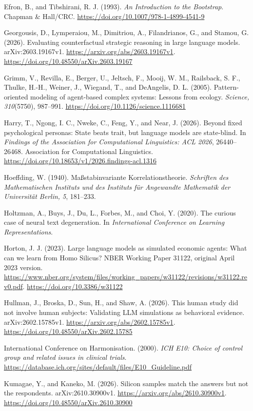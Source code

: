 \documentclass[11pt]{article}
\begin{document}
Efron, B., and Tibshirani, R. J. (1993). \emph{An Introduction to the
Bootstrap}. Chapman \& Hall/CRC.
\url{https://doi.org/10.1007/978-1-4899-4541-9}

Georgousis, D., Lymperaiou, M., Dimitriou, A., Filandrianos, G., and
Stamou, G. (2026). Evaluating counterfactual strategic reasoning in
large language models. arXiv:2603.19167v1.
\url{https://arxiv.org/abs/2603.19167v1}.
\url{https://doi.org/10.48550/arXiv.2603.19167}

Grimm, V., Revilla, E., Berger, U., Jeltsch, F., Mooij, W. M.,
Railsback, S. F., Thulke, H.-H., Weiner, J., Wiegand, T., and DeAngelis,
D. L. (2005). Pattern-oriented modeling of agent-based complex systems:
Lessons from ecology. \emph{Science, 310}(5750), 987--991.
\url{https://doi.org/10.1126/science.1116681}

Harry, T., Ngong, I. C., Nweke, C., Feng, Y., and Near, J. (2026).
Beyond fixed psychological personas: State beats trait, but language
models are state-blind. In \emph{Findings of the Association for
Computational Linguistics: ACL 2026}, 26440--26468. Association for
Computational Linguistics.
\url{https://doi.org/10.18653/v1/2026.findings-acl.1316}

Hoeffding, W. (1940). Maßstabinvariante Korrelationstheorie.
\emph{Schriften des Mathematischen Instituts und des Instituts für
Angewandte Mathematik der Universität Berlin, 5}, 181--233.

Holtzman, A., Buys, J., Du, L., Forbes, M., and Choi, Y. (2020). The
curious case of neural text degeneration. In \emph{International
Conference on Learning Representations}.

Horton, J. J. (2023). Large language models as simulated economic
agents: What can we learn from Homo Silicus? NBER Working Paper 31122,
original April 2023 version.
\url{https://www.nber.org/system/files/working_papers/w31122/revisions/w31122.rev0.pdf}.
\url{https://doi.org/10.3386/w31122}

Hullman, J., Broska, D., Sun, H., and Shaw, A. (2026). This human study
did not involve human subjects: Validating LLM simulations as behavioral
evidence. arXiv:2602.15785v1. \url{https://arxiv.org/abs/2602.15785v1}.
\url{https://doi.org/10.48550/arXiv.2602.15785}

International Conference on Harmonisation. (2000). \emph{ICH E10: Choice
of control group and related issues in clinical trials}.
\url{https://database.ich.org/sites/default/files/E10_Guideline.pdf}

Kumagae, Y., and Kaneko, M. (2026). Silicon samples match the answers
but not the respondents. arXiv:2610.30900v1.
\url{https://arxiv.org/abs/2610.30900v1}.
\url{https://doi.org/10.48550/arXiv.2610.30900}
\end{document}
